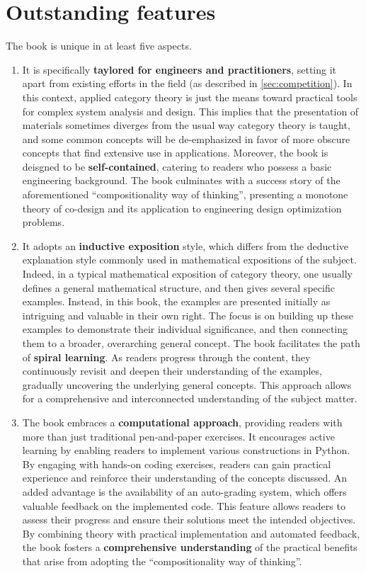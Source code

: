 \documentclass[10pt, article, one side]{memoir}
\begin{document}
    \section{Outstanding features}
    The book is unique in at least five aspects.
    \begin{enumerate}
        \item It is specifically \textbf{taylored for engineers and practitioners}, setting it apart from existing efforts in the field (as described in \cref{sec:competition}).
              In this context, applied category theory is just the means toward practical tools for complex system analysis and design.
              This implies that the presentation of materials sometimes diverges from the usual way category theory is taught, and some common concepts will be de-emphasized in favor of more obscure concepts that find extensive use in applications.
              Moreover, the book is deisgned to be \textbf{self-contained}, catering to readers who possess a basic engineering background.
              The book culminates with a success story of the aforementioned “compositionality way of thinking”, presenting a monotone theory of co-design and its application to engineering design optimization problems.
        \item It adopts an \textbf{inductive exposition} style, which differs from the deductive explanation style commonly used in mathematical expositions of the subject.
              Indeed, in a typical mathematical exposition of category theory, one usually defines a general mathematical structure, and then gives several specific examples.
              Instead, in this book, the examples are presented initially as intriguing and valuable in their own right.
              The focus is on building up these examples to demonstrate their individual significance, and then connecting them to a broader, overarching general concept.
              The book facilitates the path of \textbf{spiral learning}.
              As readers progress through the content, they continuously revisit and deepen their understanding of the examples, gradually uncovering the underlying general concepts.
              This approach allows for a comprehensive and interconnected understanding of the subject matter.
        \item The book embraces a \textbf{computational approach}, providing readers with more than just traditional pen-and-paper exercises.
              It encourages active learning by enabling readers to implement various constructions in Python.
              By engaging with hands-on coding exercises, readers can gain practical experience and reinforce their understanding of the concepts discussed.
              An added advantage is the availability of an auto-grading system, which offers valuable feedback on the implemented code.
              This feature allows readers to assess their progress and ensure their solutions meet the intended objectives.
              By combining theory with practical implementation and automated feedback, the book fosters a \textbf{comprehensive understanding} of the practical benefits that arise from adopting the ``compositionality way of thinking''.


\end{enumerate}
\end{document}
